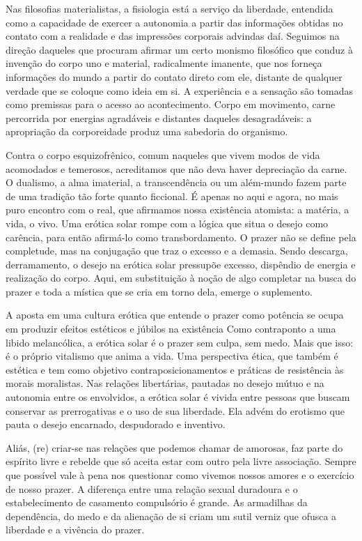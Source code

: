 Nas filosofias materialistas, a fisiologia está a serviço da liberdade,
entendida como a capacidade de exercer a autonomia a partir das
informações obtidas no contato com a realidade e das impressões
corporais advindas daí. Seguimos na direção daqueles que procuram
afirmar um certo monismo filosófico que conduz à invenção do corpo uno e
material, radicalmente imanente, que nos forneça informações do mundo a
partir do contato direto com ele, distante de qualquer verdade que se
coloque como ideia em si. A experiência e a sensação são tomadas como
premissas para o acesso ao acontecimento. Corpo em movimento, carne
percorrida por energias agradáveis e distantes daqueles desagradáveis: a
apropriação da corporeidade produz uma sabedoria do organismo.

Contra o corpo esquizofrênico, comum naqueles que vivem modos de vida
acomodados e temerosos, acreditamos que não deva haver depreciação da
carne. O dualismo, a alma imaterial, a transcendência ou um além-mundo
fazem parte de uma tradição tão forte quanto ficcional. É apenas no aqui
e agora, no mais puro encontro com o real, que afirmamos nossa
existência atomista: a matéria, a vida, o vivo. Uma erótica solar rompe
com a lógica que situa o desejo como carência, para então afirmá-lo como
transbordamento. O prazer não se define pela completude, mas na
conjugação que traz o excesso e a demasia. Sendo descarga, derramamento,
o desejo na erótica solar pressupõe excesso, dispêndio de energia e
realização do corpo. Aqui, em substituição à noção de algo completar na
busca do prazer e toda a mística que se cria em torno dela, emerge o
suplemento.

A aposta em uma cultura erótica que entende o prazer como potência se
ocupa em produzir efeitos estéticos e júbilos na existência Como
contraponto a uma libido melancólica, a erótica solar é o prazer sem
culpa, sem medo. Mais que isso: é o próprio vitalismo que anima a vida.
Uma perspectiva ética, que também é estética e tem como objetivo
contraposicionamentos e práticas de resistência às morais moralistas.
Nas relações libertárias, pautadas no desejo mútuo e na autonomia entre
os envolvidos, a erótica solar é vivida entre pessoas que buscam
conservar as prerrogativas e o uso de sua liberdade. Ela advém do
erotismo que pauta o desejo encarnado, despudorado e inventivo.

Aliás, (re) criar-se nas relações que podemos chamar de amorosas, faz
parte do espírito livre e rebelde que só aceita estar com outro pela
livre associação. Sempre que possível vale à pena nos questionar como
vivemos nossos amores e o exercício de nosso prazer. A diferença entre
uma relação sexual duradoura e o estabelecimento de casamento
compulsório é grande. As armadilhas da dependência, do medo e da
alienação de si criam um sutil verniz que ofusca a liberdade e a
vivência do prazer.


